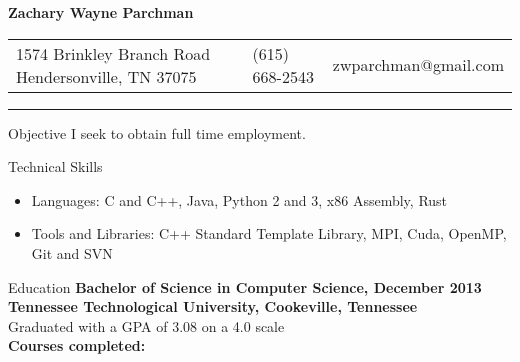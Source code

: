 \documentclass[10pt]{res}
\begin{document}
 



\fontsize{10}{11}\selectfont

\begin{resume}

\vspace{-15mm}
\begin{center}
\begin{Huge}
    \bf{Zachary Wayne Parchman}
\end{Huge}
\end{center}
\vspace{-4mm}


\begin{large}
\begin{tabularx}{\textwidth}{p{2.10in} X X}
    1574 Brinkley Branch Road \newline Hendersonville, TN 37075
    & (615) 668-2543 & zwparchman@gmail.com\\
\end{tabularx}
\end{large}

\vspace{-0.30in}
\rule{\textwidth}{0.4pt}

\begin{section}{Objective}
    I seek to obtain full time employment.
\end{section}

\begin{section}{Technical Skills}
\begin{itemize}[leftmargin=*] \itemsep -2pt  %
    \item {Languages: C and C++, Java, Python 2 and 3, x86 Assembly, Rust}
    \item {Tools and Libraries: C++ Standard Template Library, MPI, Cuda, OpenMP, Git and SVN}
\end{itemize}
\end{section}

\begin{section}{Education}
    {\bf Bachelor of Science in Computer Science, December 2013\\
    Tennessee Technological University, Cookeville, Tennessee}\\
    Graduated with a GPA of 3.08 on a 4.0 scale\\
    {\bf Courses completed:}


\end{section}
\end{resume}
\end{document}
